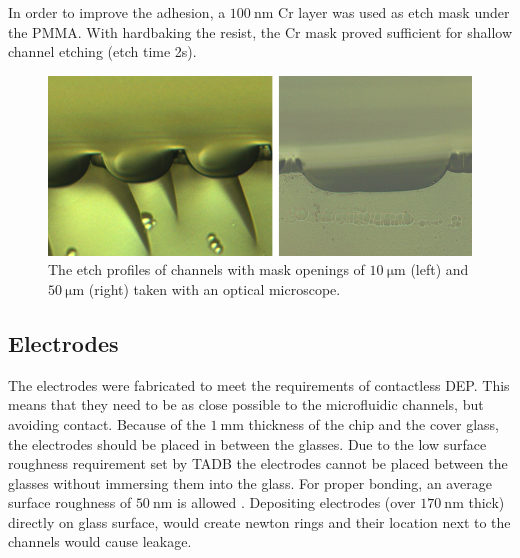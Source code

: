 \documentclass[final]{jyflluk}
\begin{document}
In order to improve the adhesion, a $\SI{100}{\nano \metre}$ Cr layer was used as etch mask under the PMMA. With hardbaking the resist, the Cr mask proved sufficient for shallow channel etching (etch time 2s).
\begin{figure}
    \centering
    \includegraphics[width=1.0\textwidth]{optical/sideetch.png}
    \caption{The etch profiles of channels with mask openings of $\SI{10}{\micro \metre}$ (left) and $\SI{50}{\micro \metre}$ (right) taken with an optical microscope.}
    \label{fig:sideetch}
\end{figure}
\newline
\newline

\subsection{Electrodes}
\label{sec:xxx4}

The electrodes were fabricated to meet the requirements of contactless DEP. This means that they need to be as close possible to the microfluidic channels, but avoiding contact. Because of the $\SI{1}{\milli \metre}$ thickness of the chip and the cover glass, the electrodes should be placed in between the glasses. Due to the low surface roughness requirement set by TADB the electrodes cannot be placed between the glasses without immersing them into the glass. For proper bonding, an average surface roughness of $\SI{50}{\nano \metre}$ is allowed \cite{chen2009thermal}. Depositing electrodes (over $\SI{170}{\nano \metre}$ thick) directly on glass surface, would create newton rings and their location next to the channels would cause leakage. 
\end{document}
